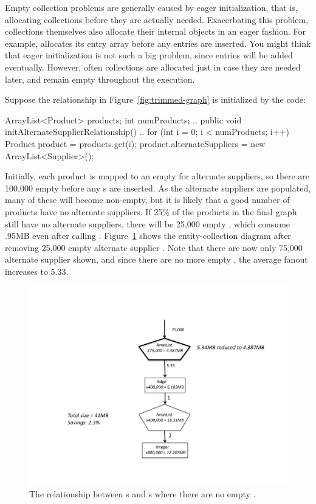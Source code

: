 Empty collection problems are generally caused by eager initialization, that is,
allocating collections before they are actually needed. Exacerbating this
problem, collections themselves also allocate their internal objects in an eager
fashion. For example,  allocates its entry array before any entries are inserted.
You might think that eager initialization is not such a big problem, since
entries will be added eventually. However, often collections are allocated
just in case they are needed later, and remain empty throughout the execution.

Suppose the relationship
in Figure~\ref{fig:trimmed-graph} is initialized by the code:
\begin{shortlisting}
ArrayList<Product> products;
int numProducts;
   ..
   public void initAlternateSupplierRelationship() {
       ..
       for (int i = 0; i < numProducts; i++) {
          Product product = products.get(i);
          product.alternateSuppliers = new ArrayList<Supplier>();
       }
   }
\end{shortlisting}
Initially, each product is mapped to an empty  for alternate
suppliers, so there are 100,000 empty  before any
s are inserted. As the alternate suppliers are populated, many
of these  will become non-empty, but it is likely that a good
number of products have no alternate suppliers. If 25\% of the products in the
final graph still have no alternate suppliers, there will be 25,000 empty
, which consume .95MB even after calling . 
Figure~\ref{fig:empty-array} shows the entity-collection
diagram after removing 25,000 empty alternate supplier . Note
that there are now only 75,000 alternate supplier  shown, and
since there are no more empty , the average fanout increases to 5.33. 
\begin{figure}
  \centering
 \includegraphics[width=.80\textwidth]{part1/Figures/collections/empty-array.pdf}
  \caption{The relationship between s and s
  where there are no empty .}
  \label{fig:empty-array}
\end{figure}
 
